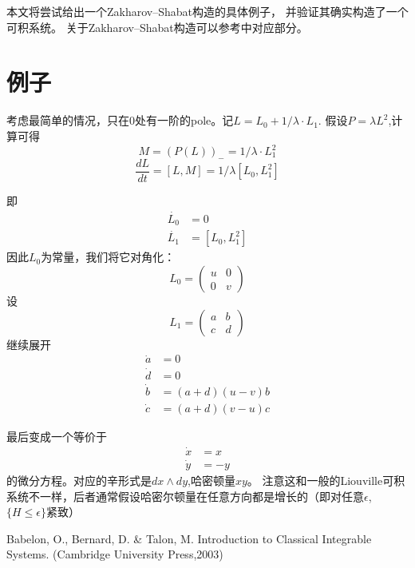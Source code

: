 本文将尝试给出一个Zakharov–Shabat构造的具体例子，
并验证其确实构造了一个可积系统。
关于Zakharov–Shabat构造可以参考\cite{1}中对应部分。
\section{例子}
考虑最简单的情况，只在0处有一阶的pole。记$L=L_0+1/\lambda\cdot L_1$.
假设$P=\lambda L^2$,计算可得
$$M=(P(L))_{-}=1/\lambda\cdot L_1^2$$
$$\frac{dL}{dt}=[L,M]=1/\lambda[L_0,L_1^2]$$

即
\begin{align*}
\dot{L_0}&=0\\
\dot{L_1}&=[L_0,L_1^2]
\end{align*}
因此$L_0$为常量，我们将它对角化：
$$L_0=\begin{pmatrix}u& 0\\0& v\end{pmatrix}$$
设
$$L_1=\begin{pmatrix}a& b\\c& d\end{pmatrix}$$
继续展开
\begin{align*}
\dot{a}&=0\\
\dot{d}&=0\\
\dot{b}&=(a+d)(u-v)b\\
\dot{c}&=(a+d)(v-u)c
\end{align*}

最后变成一个等价于
\begin{align*}
\dot{x}&=x\\
\dot{y}&=-y
\end{align*}
的微分方程。对应的辛形式是$dx\wedge dy$,哈密顿量$xy$。
注意这和一般的Liouville可积系统不一样，后者通常假设哈密尔顿量在任意方向都是增长的（即对任意$\epsilon$, $\{H\le \epsilon\}$紧致）
\begin{thebibliography}
    Babelon, O., Bernard, D. \& Talon, M. Introduction to Classical Integrable Systems. (Cambridge University Press,2003)
\end{thebibliography}
